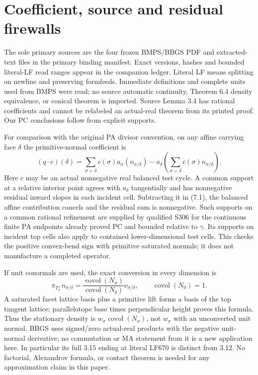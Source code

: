 \documentclass[11pt]{article}
\begin{document}
\section{Coefficient, source and residual firewalls}
The sole primary sources are the four frozen BMPS/BBGS PDF and extracted-text files in the primary binding manifest. Exact versions, hashes and bounded literal-LF read ranges appear in the companion ledger. Literal LF means splitting on newline and preserving formfeeds. Immediate definitions and complete units used from BMPS were read; no source automatic continuity, Theorem 6.4 density equivalence, or conical theorem is imported. Source Lemma 3.4 has rational coefficients and cannot be relabeled an actual-real theorem from its printed proof. Our PC conclusions follow from explicit supports.

For comparison with the original PA divisor convention, on any affine carrying face $\delta$ the primitive-normal coefficient is
\[
 (q\cdot c)(\delta)=\sum_{\sigma\succ\delta}c(\sigma)a_\sigma(n_{\sigma/\delta})
 -a_\delta\!\left(\sum_{\sigma\succ\delta}c(\sigma)n_{\sigma/\delta}\right).       \tag{7.1}
\]
Here $c$ may be an actual nonnegative real balanced test cycle. A common support at a relative interior point agrees with $a_\delta$ tangentially and has nonnegative residual inward slopes in each incident cell. Subtracting it in (7.1), the balanced affine contribution cancels and the residual sum is nonnegative. Such supports on a common rational refinement are supplied by qualified S306 for the continuous finite PA endpoints already proved PC and bounded relative to $\gamma$. Its supports on incident top cells also apply to contained lower-dimensional test cells. This checks the positive convex-bend sign with primitive saturated normals; it does not manufacture a completed operator.

If unit conormals are used, the exact conversion in every dimension is
\[
 \pi_{T_\delta^\perp}n_{\sigma/\delta}
 =\frac{\operatorname{covol}(N_\sigma)}{\operatorname{covol}(N_\delta)}\nu_{\sigma/\delta},
 \qquad \operatorname{covol}(N_{0})=1.
\]
A saturated facet lattice basis plus a primitive lift forms a basis of the top tangent lattice; parallelotope base times perpendicular height proves this formula. Thus the stationary density is $w_\sigma\operatorname{covol}(N_\sigma)$, not $w_\sigma$ with an unconverted unit normal. BBGS uses signed/zero actual-real products with the negative unit-normal derivative; no commutation or MA statement from it is a new application here. In particular its full 3.15 ending at literal LF670 is distinct from 3.12. No factorial, Alexandrov formula, or contact theorem is needed for any approximation claim in this paper.
\end{document}
